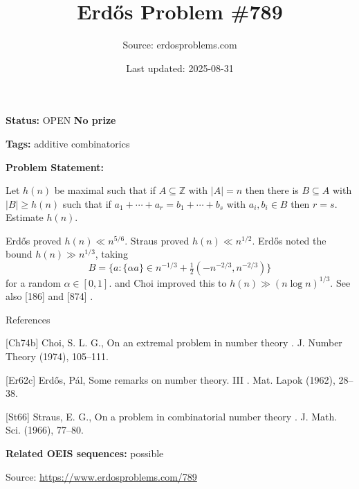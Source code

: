\documentclass{article}
\title{Erd\H{o}s Problem \#789}
\date{Last updated: 2025-08-31}
\author{Source: erdosproblems.com}
\begin{document}
\maketitle

\noindent\textbf{Status:} OPEN \quad \textbf{No prize}

\noindent\textbf{Tags:} additive combinatorics

\medskip

\noindent\textbf{Problem Statement:}

Let $h(n)$ be maximal such that if $A\subseteq \mathbb{Z}$ with $\lvert A\rvert=n$ then there is $B\subseteq A$ with $\lvert B\rvert \geq h(n)$ such that if $a_1+\cdots+a_r=b_1+\cdots+b_s$ with $a_i,b_i\in B$ then $r=s$. Estimate $h(n)$.




Erd\H{o}s \cite{Er62c} proved $h(n) \ll n^{5/6}$. Straus \cite{St66} proved $h(n) \ll n^{1/2}$. Erd\H{o}s noted the bound $h(n)\gg n^{1/3}$, taking\[B=\{ a: \{ \alpha a\} \in n^{-1/3}+\tfrac{1}{2} (-n^{-2/3},n^{-2/3})\}\]for a random $\alpha\in [0,1]$. \cite{Er62c} and Choi \cite{Ch74b} improved this to $h(n) \gg (n\log n)^{1/3}$. See also [186] and [874] .




References

[Ch74b] Choi, S. L. G., On an extremal problem in number theory . J. Number Theory (1974), 105--111.

[Er62c] Erd\H{o}s, P\'{a}l, Some remarks on number theory. {III} . Mat. Lapok (1962), 28--38.

[St66] Straus, E. G., On a problem in combinatorial number theory . J. Math. Sci. (1966), 77--80.

\noindent\textbf{Related OEIS sequences:} possible


\bigskip
\noindent\small{Source: \url{https://www.erdosproblems.com/789}}
\end{document}
